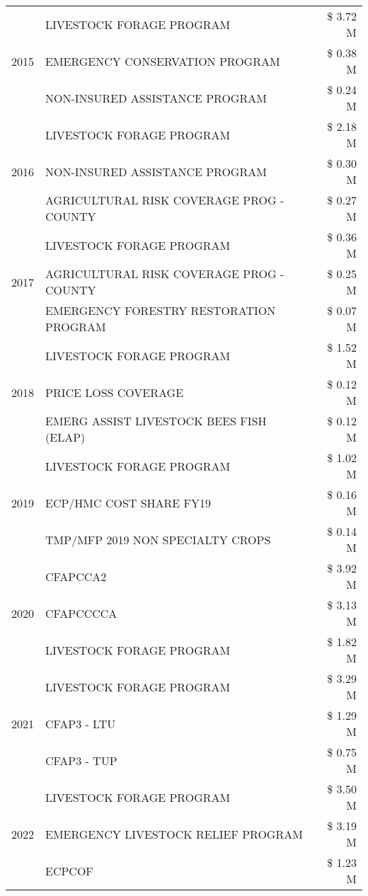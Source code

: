 \begin{tabular}{llr}
\multirow[t]{3}{*}{2015} & LIVESTOCK FORAGE PROGRAM & \$ 3.72 M \\
 & EMERGENCY CONSERVATION PROGRAM & \$ 0.38 M \\
 & NON-INSURED ASSISTANCE PROGRAM & \$ 0.24 M \\
\cline{1-3}
\multirow[t]{3}{*}{2016} & LIVESTOCK FORAGE PROGRAM & \$ 2.18 M \\
 & NON-INSURED ASSISTANCE PROGRAM & \$ 0.30 M \\
 & AGRICULTURAL RISK COVERAGE PROG - COUNTY & \$ 0.27 M \\
\cline{1-3}
\multirow[t]{3}{*}{2017} & LIVESTOCK FORAGE PROGRAM & \$ 0.36 M \\
 & AGRICULTURAL RISK COVERAGE PROG - COUNTY & \$ 0.25 M \\
 & EMERGENCY FORESTRY RESTORATION PROGRAM & \$ 0.07 M \\
\cline{1-3}
\multirow[t]{3}{*}{2018} & LIVESTOCK FORAGE PROGRAM & \$ 1.52 M \\
 & PRICE LOSS COVERAGE & \$ 0.12 M \\
 & EMERG ASSIST LIVESTOCK BEES FISH (ELAP) & \$ 0.12 M \\
\cline{1-3}
\multirow[t]{3}{*}{2019} & LIVESTOCK FORAGE PROGRAM & \$ 1.02 M \\
 & ECP/HMC COST SHARE FY19 & \$ 0.16 M \\
 & TMP/MFP 2019 NON SPECIALTY CROPS & \$ 0.14 M \\
\cline{1-3}
\multirow[t]{3}{*}{2020} & CFAPCCA2 & \$ 3.92 M \\
 & CFAPCCCCA & \$ 3.13 M \\
 & LIVESTOCK FORAGE PROGRAM & \$ 1.82 M \\
\cline{1-3}
\multirow[t]{3}{*}{2021} & LIVESTOCK FORAGE PROGRAM & \$ 3.29 M \\
 & CFAP3 - LTU & \$ 1.29 M \\
 & CFAP3 - TUP & \$ 0.75 M \\
\cline{1-3}
\multirow[t]{3}{*}{2022} & LIVESTOCK FORAGE PROGRAM & \$ 3.50 M \\
 & EMERGENCY LIVESTOCK RELIEF PROGRAM & \$ 3.19 M \\
 & ECPCOF & \$ 1.23 M \\
\cline{1-3}
\bottomrule
\end{tabular}
